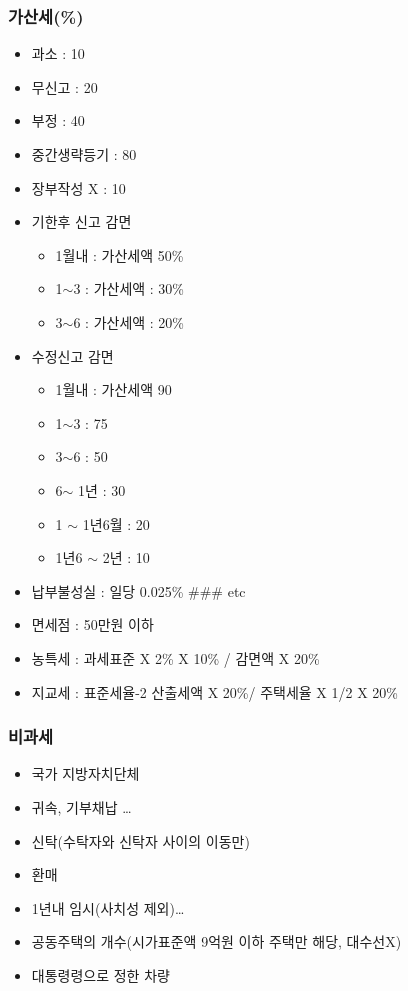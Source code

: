 \documentclass{oblivoir}
\begin{document}
\begin{multicols}{2}
\subsubsection{가산세(\%)}\label{uxac00uxc0b0uxc138}

\begin{itemize}
\itemsep1pt\parskip0pt
\item
  과소 : 10
\item
  무신고 : 20
\item
  부정 : 40
\item
  중간생략등기 : 80
\item
  장부작성 X : 10
\item
  기한후 신고 감면

  \begin{itemize}
  \itemsep1pt\parskip0pt
  \item
    1월내 : 가산세액 50\%
  \item
    1$\sim$3 : 가산세액 : 30\%
  \item
    3$\sim$6 : 가산세액 : 20\%
  \end{itemize}
\item
  수정신고 감면

  \begin{itemize}
  \itemsep1pt\parskip0pt
  \item
    1월내 : 가산세액 90
  \item
    1$\sim$3 : 75
  \item
    3$\sim$6 : 50
  \item
    6$\sim$ 1년 : 30
  \item
    1 $\sim$ 1년6월 : 20
  \item
    1년6 $\sim$ 2년 : 10
  \end{itemize}
\item
  납부불성실 : 일당 0.025\% \#\#\# etc
\item
  면세점 : 50만원 이하
\item
  농특세 : 과세표준 X 2\% X 10\% / 감면액 X 20\%
\item
  지교세 : 표준세율-2 산출세액 X 20\%/ 주택세율 X 1/2 X 20\%
\end{itemize}

\subsubsection{비과세}\label{uxbe44uxacfcuxc138}

\begin{itemize}
\itemsep1pt\parskip0pt
\item
  국가 지방자치단체
\item
  귀속, 기부채납 \ldots{}
\item
  신탁(수탁자와 신탁자 사이의 이동만)
\item
  환매
\item
  1년내 임시(사치성 제외)\ldots{}
\item
  공동주택의 개수(시가표준액 9억원 이하 주택만 해당, 대수선X)
\item
  대통령령으로 정한 차량
\end{itemize}


\end{multicols}
\end{document}
